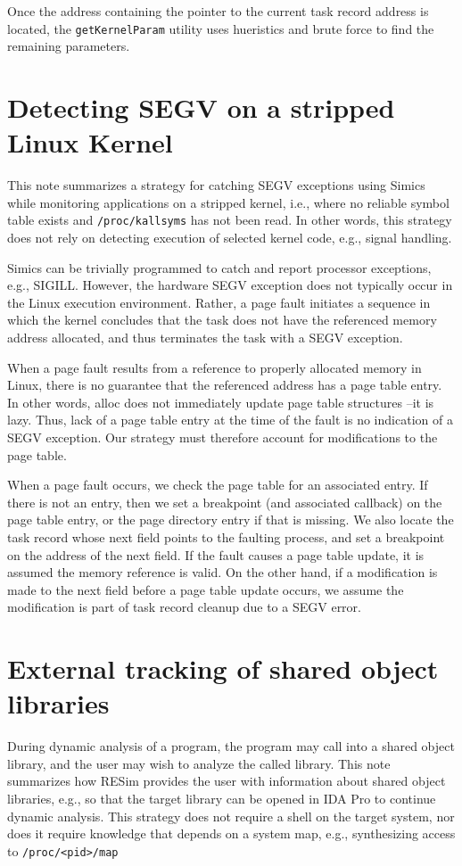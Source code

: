 \documentclass[titlepage]{article}
\begin{document}
Once the address containing the pointer to the current task record address is located, the {\tt getKernelParam} utility uses hueristics and brute force to
find the remaining parameters.

\section{Detecting SEGV on a stripped Linux Kernel}
\label{SEGV}
This note summarizes a strategy for catching SEGV exceptions using Simics while monitoring applications on a stripped kernel, i.e., where no reliable symbol table exists and {\tt /proc/kallsyms} has not been read.  In other words, this strategy does not rely on detecting execution of selected kernel code, e.g., signal handling.

Simics can be trivially programmed to catch and report processor exceptions, e.g., SIGILL.  However, the hardware SEGV exception does not typically occur in the Linux execution environment.  Rather, a page fault initiates a sequence in which the kernel concludes that the task does not have the referenced memory address allocated, and thus terminates the task with a SEGV exception.

When a page fault results from a reference to properly allocated memory in Linux, there is no guarantee that the referenced address has a page table entry. In other words, alloc does not immediately update page table structures --it is lazy.  Thus, lack of a page table entry at the time of the fault is no indication of a SEGV exception.  Our strategy must therefore account for modifications to the page table.

When a page fault occurs, we check the page table for an associated entry. If there is not an entry, then we set a breakpoint (and associated callback) on the page table entry, or the page directory entry if that is missing.  We also locate the task record whose next field points to the faulting process, and set a breakpoint on the address of the next field.  If the fault causes a page table update, it is assumed the memory reference is valid.  On the other hand, if a modification is made to the next field before a page table update occurs, we assume the modification is part of task record cleanup due to a SEGV error.

\section{External tracking of shared object libraries}
During dynamic analysis of a program, the program may call into a shared object library, and the user may wish to analyze the called library.  This note summarizes how RESim provides the user with information about shared object libraries, e.g., so that the target library can be opened in IDA Pro to continue dynamic analysis.  This strategy does not require a shell on the target system, nor does it require knowledge that depends on a system map, e.g., 
synthesizing access to {\tt /proc/<pid>/map}
\end{document}
